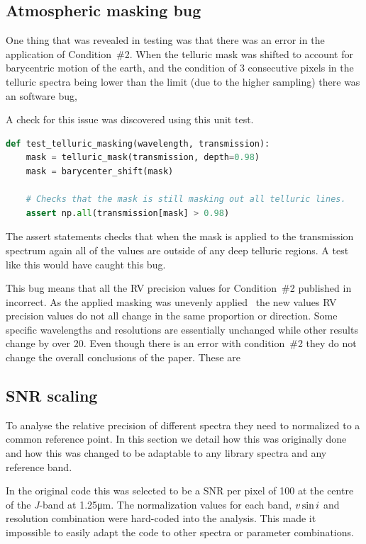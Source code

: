\subsection{Atmospheric masking bug}
One thing that was revealed in testing was that there was an error in the application of Condition~\#2. When the telluric mask was shifted to account for barycentric motion of the earth, and the condition of 3 consecutive pixels in the telluric spectra being lower than the limit (due to the higher sampling) there was an software bug,


A check for this issue was discovered using this unit test.
\begin{lstlisting}[language=Python, caption=Example unit test to catch masking bug.]
def test_telluric_masking(wavelength, transmission):
    mask = telluric_mask(transmission, depth=0.98)
    mask = barycenter_shift(mask)

    # Checks that the mask is still masking out all telluric lines.
    assert np.all(transmission[mask] > 0.98)
\end{lstlisting}
The assert statements checks that when the mask is applied to the transmission spectrum again all of the values are outside of any deep telluric regions. A test like this would have caught this bug.

This bug means that all the {RV} precision values for Condition~\#2 published in~\citet{figueira_radial_2016} incorrect. As the applied masking was unevenly applied~\citet{figueira_radial_2016} the new values {RV} precision values do not all change in the same proportion or direction. Some specific wavelengths and resolutions are essentially unchanged while other results change by over 20\mps{}.  Even though there is an error with condition~\#2 they do not change the overall conclusions of the paper. These are 

\subsection{SNR scaling}
\label{subsec:snr_scaling}
To analyse the relative precision of different spectra they need to normalized to a common reference point. In this section we detail how this was originally done and how this was changed to be adaptable to any library spectra and any reference band.

In the original code this was selected to be a {SNR} per pixel of 100 at the centre of the \textit{J}-band at 1.25\si{\micro\meter}. The normalization values for each band, \(v\sin{i}\) and resolution combination were hard-coded into the analysis. This made it impossible to easily adapt the code to other spectra or parameter combinations.

